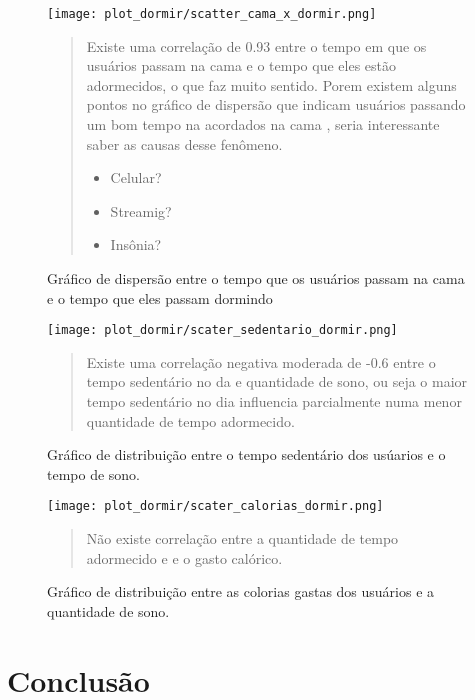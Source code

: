 \documentclass[a4paper, oneside]{report}
\begin{document}
\begin{figure}[h]
\centering %
\texttt{[image: plot\_dormir/scatter\_cama\_x\_dormir.png]}
\caption{Gráfico de dispersão entre o tempo que os usuários passam na cama e o tempo que eles passam dormindo}
\label{figura:Figura 4}
\begin{quotation}
Existe uma correlação de 0.93 entre o tempo em que os usuários passam na cama e o tempo que eles estão adormecidos, o que faz muito sentido. Porem existem alguns pontos no gráfico de dispersão que indicam usuários passando um bom tempo na acordados na cama , seria interessante saber as causas desse fenômeno.
\begin{itemize}
\item Celular?
\item Streamig?
\item Insônia?
\end{itemize}
\end{quotation}
\end{figure}


\begin{figure}[h]
\centering %
\texttt{[image: plot\_dormir/scater\_sedentario\_dormir.png]} 
\caption{Gráfico de distribuição entre o tempo sedentário dos usúarios e o tempo de sono.}
\label{figura:Figura 5}

\begin{quotation}
Existe uma correlação negativa moderada de -0.6 entre o tempo sedentário no da e quantidade de sono, ou seja o maior tempo sedentário no dia influencia parcialmente numa menor quantidade de tempo adormecido.
\end{quotation}
\end{figure}


\begin{figure}[h]
\centering %
\texttt{[image: plot\_dormir/scater\_calorias\_dormir.png]} %
\caption{Gráfico de distribuição entre as colorias gastas dos usuários e a quantidade de sono.}
\label{figura: Figura 6}
\begin{quotation}
Não existe correlação entre a quantidade de tempo adormecido e e o gasto calórico.
\end{quotation}
\end{figure}


\chapter*{Conclusão}
\end{document}
